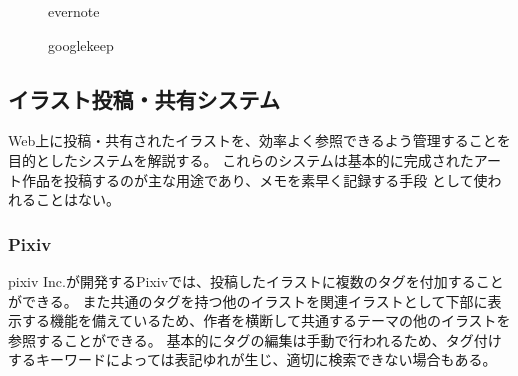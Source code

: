\begin{figure}[htbp] \begin{minipage}{0.5\hsize}
                         \begin{center} 
                         \end{center} \caption{evernote} \label{fig:evernote}
\end{minipage} \begin{minipage}{0.5\hsize}
                   \begin{center} 
                   \end{center} \caption{googlekeep} \label{fig:googlekeep}
\end{minipage}
\end{figure}

\subsection{イラスト投稿・共有システム}
Web上に投稿・共有されたイラストを、効率よく参照できるよう管理することを目的としたシステムを解説する。
これらのシステムは基本的に完成されたアート作品を投稿するのが主な用途であり、メモを素早く記録する手段
として使われることはない。

\subsubsection{Pixiv}

pixiv Inc.が開発するPixivでは、投稿したイラストに複数のタグを付加することができる。
また共通のタグを持つ他のイラストを関連イラストとして下部に表示する機能を備えているため、作者を横断して共通するテーマの他のイラストを参照することができる。
基本的にタグの編集は手動で行われるため、タグ付けするキーワードによっては表記ゆれが生じ、適切に検索できない場合もある。

